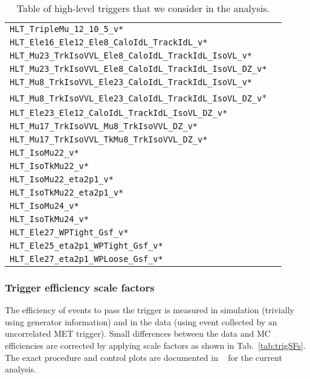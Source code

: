 \begin{table}
\begin{tabular}{ll}
\verb|HLT_TripleMu_12_10_5_v*|\\
\verb|HLT_Ele16_Ele12_Ele8_CaloIdL_TrackIdL_v*|\\
\verb|HLT_Mu23_TrkIsoVVL_Ele8_CaloIdL_TrackIdL_IsoVL_v*|\\
\verb|HLT_Mu23_TrkIsoVVL_Ele8_CaloIdL_TrackIdL_IsoVL_DZ_v*| \\
\verb|HLT_Mu8_TrkIsoVVL_Ele23_CaloIdL_TrackIdL_IsoVL_v*|\\
\verb|HLT_Mu8_TrkIsoVVL_Ele23_CaloIdL_TrackIdL_IsoVL_DZ_v|* \\
\verb|HLT_Ele23_Ele12_CaloIdL_TrackIdL_IsoVL_DZ_v*|\\
\verb|HLT_Mu17_TrkIsoVVL_Mu8_TrkIsoVVL_DZ_v*|\\
\verb|HLT_Mu17_TrkIsoVVL_TkMu8_TrkIsoVVL_DZ_v*|\\
\verb|HLT_IsoMu22_v*|\\
\verb|HLT_IsoTkMu22_v*|\\
\verb|HLT_IsoMu22_eta2p1_v*|\\
\verb|HLT_IsoTkMu22_eta2p1_v*|\\
\verb|HLT_IsoMu24_v*|\\
\verb|HLT_IsoTkMu24_v*|\\
\verb|HLT_Ele27_WPTight_Gsf_v*|\\
\verb|HLT_Ele25_eta2p1_WPTight_Gsf_v*|\\
\verb|HLT_Ele27_eta2p1_WPLoose_Gsf_v*|\\
\hline
\end{tabular}
\caption{Table of high-level triggers that we consider in the analysis.} \label{tab:triggers}
\end{table}

\subsubsection*{Trigger efficiency scale factors}
The efficiency of events to pass the trigger is measured in simulation (trivially using generator information) and in the data (using event collected by an uncorrelated MET trigger). Small differences between the data and MC efficiencies are corrected by applying scale factors as shown in Tab.~\ref{tab:trigSFs}. The exact procedure and control plots are documented in ~\cite{CMS_AN_2017-029} for the current analysis.

